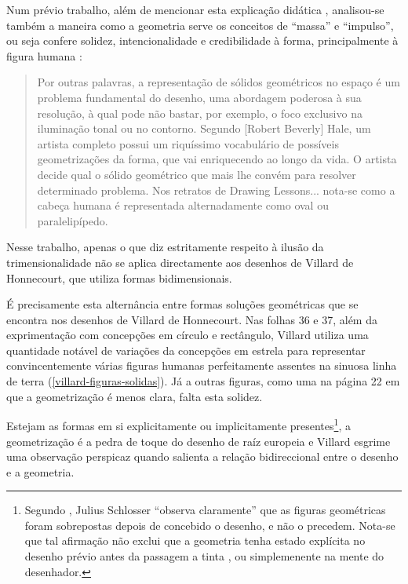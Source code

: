 \documentclass{article}
\begin{document}
Num prévio trabalho, além de mencionar esta explicação didática
\cite[p. 17]{tavora}, analisou-se também a maneira como a geometria
serve os conceitos de ``massa'' e ``impulso'', ou seja confere
solidez, intencionalidade e credibilidade à forma, principalmente à
figura humana \cite[p. 6]{tavora}:

\begin{quote}
  Por outras palavras, a representação de sólidos geométricos no
  espaço é um problema fundamental do desenho, uma abordagem poderosa
  à sua resolução, à qual pode não bastar, por exemplo, o foco
  exclusivo na iluminação tonal ou no contorno. Segundo [Robert
    Beverly] Hale, um artista completo possui um riquíssimo
  vocabulário de possíveis geometrizações da forma, que vai
  enriquecendo ao longo da vida. O artista decide qual o sólido
  geométrico que mais lhe convém para resolver determinado
  problema. Nos retratos de Drawing Lessons... nota-se como a cabeça
  humana é representada alternadamente como oval ou paralelipípedo.
\end{quote}

Nesse trabalho, apenas o que diz estritamente respeito à ilusão da
trimensionalidade não se aplica directamente aos desenhos de Villard
de Honnecourt, que utiliza formas bidimensionais.

É precisamente esta alternância entre formas soluções geométricas que
se encontra nos desenhos de Villard de Honnecourt. Nas folhas 36 e 37,
além da exprimentação com concepções em círculo e rectângulo, Villard
utiliza uma quantidade notável de variações da concepções em estrela
para representar convincentemente várias figuras humanas perfeitamente
assentes na sinuosa linha de terra (\ref{villard-figuras-solidas}). Já
a outras figuras, como uma na página 22 em que a geometrização é menos
clara, falta esta solidez.

Estejam as formas em si explicitamente ou implicitamente
presentes\footnote{Segundo \cite{teresa}, Julius Schlosser ``observa
  claramente'' que as figuras geométricas foram sobrepostas depois de
  concebido o desenho, e não o precedem. Nota-se que tal afirmação não
  exclui que a geometria tenha estado explícita no desenho prévio
  antes da passagem a tinta \cite{calado}, ou simplemenente na mente
  do desenhador.}, a geometrização é a pedra de toque do desenho de
raíz europeia e Villard esgrime uma observação perspicaz quando
salienta a relação bidireccional entre o desenho e a geometria.
\end{document}

